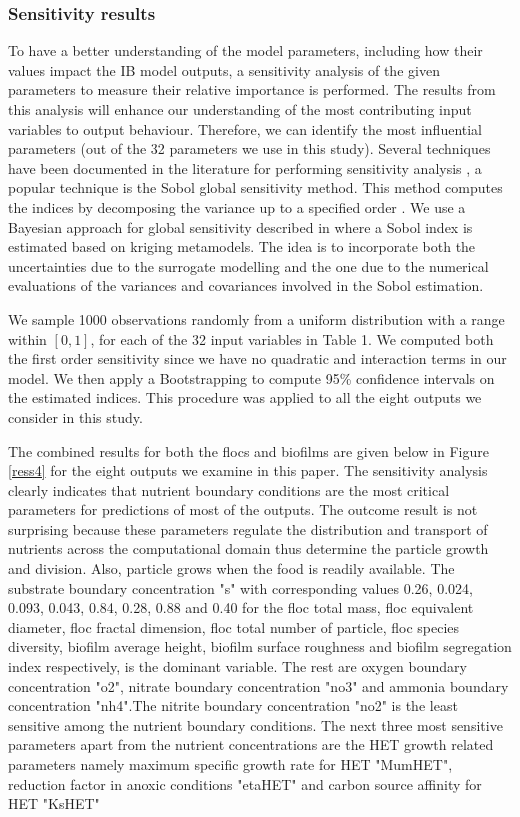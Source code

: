\subsubsection{Sensitivity results}
To have a better understanding of the model parameters, including how their values impact the IB model outputs, a sensitivity analysis of the given parameters to measure their relative importance is performed. The results from this analysis will enhance our understanding of the most contributing input variables to output behaviour. Therefore, we can identify the most influential parameters (out of the 32 parameters we use in this study). Several techniques have been documented in the literature for performing sensitivity analysis \citet{co11}, a popular technique is the Sobol global sensitivity method. This method computes the indices by decomposing the variance up to a specified order \citet{co10}. We use a Bayesian approach for global sensitivity described in \citet{co12} where a Sobol index is estimated based on kriging metamodels. The idea is to incorporate both the uncertainties due to the surrogate modelling and the one due to the numerical evaluations of the variances and covariances involved in the Sobol estimation. 

We sample 1000 observations randomly from a uniform distribution with a range within $[0,1]$, for each of the 32 input variables in Table 1. We computed both the first order sensitivity since we have no quadratic and interaction terms in our model. We then apply a Bootstrapping to compute 95\% confidence intervals on the estimated indices. This procedure was applied to all the eight outputs we consider in this study.


The combined results for both the flocs and biofilms are given below in Figure~ \ref{ress4} for the eight outputs we examine in this paper. The sensitivity analysis clearly indicates that nutrient boundary conditions are the most
critical parameters for predictions of most of the outputs. The outcome result is not surprising because these parameters regulate the distribution and transport of nutrients across the computational domain thus determine the particle growth and division. Also, particle grows when the food is readily available. The substrate boundary concentration "s" with corresponding values 0.26, 0.024, 0.093, 0.043, 0.84, 0.28, 0.88 and  0.40 for the floc total mass, floc equivalent diameter, floc fractal dimension, floc total number of particle, floc species diversity, biofilm average height, biofilm surface roughness and biofilm segregation index respectively, is the dominant variable. The rest are oxygen boundary concentration "o2", nitrate boundary concentration "no3" and ammonia boundary concentration "nh4".The nitrite boundary concentration "no2" is the least sensitive among the nutrient boundary conditions. The next three most sensitive parameters apart from the nutrient concentrations are the HET growth related parameters namely maximum specific growth rate for HET "MumHET", reduction factor in anoxic conditions "etaHET" and  carbon source affinity for HET "KsHET"

